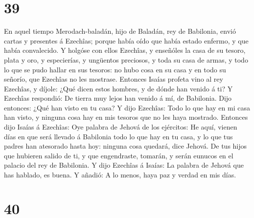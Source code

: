\hypertarget{section-38}{%
\section{39}\label{section-38}}

 En aquel tiempo Merodach-baladán, hijo de Baladán, rey de
Babilonia, envió cartas y presentes á Ezechîas; porque había oído que
había estado enfermo, y que había convalecido.  Y holgóse
con ellos Ezechîas, y enseñóles la casa de su tesoro, plata y oro, y
especierías, y ungüentos preciosos, y toda su casa de armas, y todo lo
que se pudo hallar en sus tesoros: no hubo cosa en su casa y en todo su
señorío, que Ezechîas no les mostrase.  Entonces Isaías
profeta vino al rey Ezechîas, y díjole: ¿Qué dicen estos hombres, y de
dónde han venido á ti? Y Ezechîas respondió: De tierra muy lejos han
venido á mí, de Babilonia.  Dijo entonces: ¿Qué han visto
en tu casa? Y dijo Ezechîas: Todo lo que hay en mi casa han visto, y
ninguna cosa hay en mis tesoros que no les haya mostrado. 
Entonces dijo Isaías á Ezechîas: Oye palabra de Jehová de los ejércitos:
 He aquí, vienen días en que será llevado á Babilonia todo
lo que hay en tu casa, y lo que tus padres han atesorado hasta hoy:
ninguna cosa quedará, dice Jehová.  De tus hijos que
hubieren salido de ti, y que engendraste, tomarán, y serán eunucos en el
palacio del rey de Babilonia.  Y dijo Ezechîas á Isaías:
La palabra de Jehová que has hablado, es buena. Y añadió: A lo menos,
haya paz y verdad en mis días.

\hypertarget{section-39}{%
\section{40}\label{section-39}}

